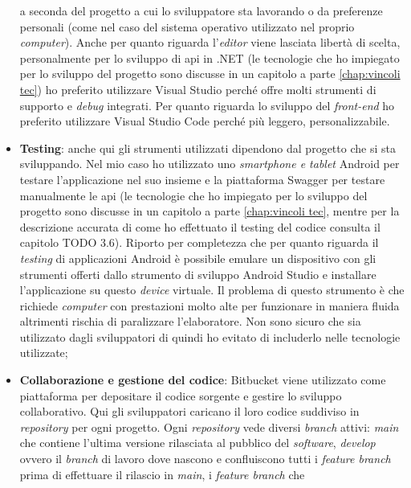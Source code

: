 \begin{itemize}
            a seconda del progetto a cui lo sviluppatore sta lavorando o da preferenze personali (come nel caso del 
            sistema operativo utilizzato nel proprio \textit{computer}). Anche per quanto riguarda l'\textit{editor} viene lasciata 
            libertà di scelta, personalmente per lo sviluppo di \gls{api} in .NET (le tecnologie che ho impiegato per lo sviluppo del 
            progetto sono discusse in un capitolo a parte \ref{chap:vincoli tec}) ho preferito utilizzare Visual Studio perché offre 
            molti strumenti di supporto e \textit{debug} integrati. Per quanto riguarda lo sviluppo del \textit{front-end} ho 
            preferito utilizzare Visual Studio Code perché più leggero, personalizzabile.
      \item \textbf{Testing}: anche qui gli strumenti utilizzati dipendono dal progetto che si sta sviluppando. Nel mio 
            caso ho utilizzato uno \textit{smartphone e tablet} Android per testare l'applicazione nel suo insieme e la 
            piattaforma Swagger per testare manualmente le \gls{api} (le tecnologie che ho impiegato per lo sviluppo del 
            progetto sono discusse in un capitolo a parte \ref{chap:vincoli tec}, mentre per la descrizione accurata di come ho 
            effettuato il testing del codice consulta il capitolo TODO 3.6). Riporto per completezza che per 
            quanto riguarda il \textit{testing} di applicazioni Android è possibile emulare un dispositivo con gli 
            strumenti offerti dallo strumento di sviluppo Android Studio e installare l'applicazione su questo \textit{device} 
            virtuale. Il problema di questo strumento è che richiede \textit{computer} con prestazioni molto alte per funzionare 
            in maniera fluida altrimenti rischia di paralizzare l'elaboratore. Non sono sicuro che sia utilizzato dagli 
            sviluppatori di {\company} quindi ho evitato di includerlo nelle tecnologie utilizzate;
      \item \textbf{Collaborazione e gestione del codice}: Bitbucket viene utilizzato come piattaforma per depositare il codice 
            sorgente e gestire lo sviluppo collaborativo. Qui gli sviluppatori caricano il loro 
            codice suddiviso in \textit{repository} per ogni progetto. Ogni \textit{repository} vede diversi 
            \textit{branch} attivi: \textit{main} che contiene l'ultima versione rilasciata al pubblico del \textit{software}, 
            \textit{develop} ovvero il \textit{branch} di lavoro dove nascono e confluiscono tutti i 
            \textit{feature branch} prima di effettuare il rilascio in \textit{main}, i \textit{feature branch} che 

\end{itemize}
